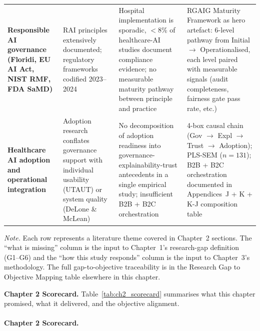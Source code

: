 {\begin{xltabular}{\textwidth}{@{} >{\bfseries}p{2.4cm} p{3.5cm} p{4.1cm} p{4.2cm} @{}}
Responsible AI governance (Floridi, EU AI Act, NIST RMF, FDA SaMD) & RAI principles extensively documented; regulatory frameworks codified 2023--2024 & Hospital implementation is sporadic, $<$8\% of healthcare-AI studies document compliance evidence; no measurable maturity pathway between principle and practice & RGAIG Maturity Framework as hero artefact: 6-level pathway from Initial $\to$ Operationalised, each level paired with measurable signals (audit completeness, fairness gate pass rate, etc.) \\
Healthcare AI adoption and operational integration & Adoption research conflates governance support with individual usability (UTAUT) or system quality (DeLone \& McLean) & No decomposition of adoption readiness into governance-explainability-trust antecedents in a single empirical study; insufficient B2B + B2C orchestration & 4-box causal chain (Gov $\to$ Expl $\to$ Trust $\to$ Adoption); PLS-SEM ($n=131$); B2B + B2C orchestration documented in Appendices~J + K + K-J composition table \\
\end{xltabular}}
\vspace{0.5em}
\noindent\textit{Note.} Each row represents a literature theme covered in Chapter~2 sections. The ``what is missing'' column is the input to Chapter~1's research-gap definition (G1--G6) and the ``how this study responds'' column is the input to Chapter~3's methodology. The full gap-to-objective traceability is in the Research Gap to Objective Mapping table elsewhere in this chapter.

\noindent\textbf{Chapter 2 Scorecard.} Table~\ref{tab:ch2_scorecard} summarises what this chapter promised, what it delivered, and the objective alignment.

\paragraph{Chapter 2 Scorecard.}


